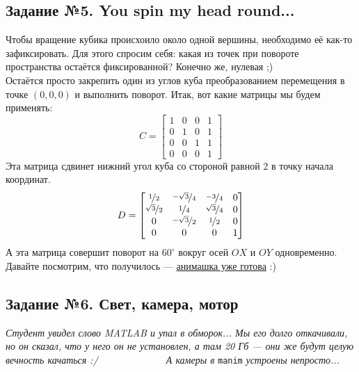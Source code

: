 \documentclass[a3paper,14pt]{extarticle}
\begin{document}
\subsection*{\centering Задание №5. You spin my head round...}
Чтобы вращение кубика происхоило около одной вершины, необходимо её как-то зафиксировать. Для этого спросим себя: какая из точек при повороте пространства остаётся фиксированной? Конечно же, нулевая ;)\\[0.5em]
Остаётся просто закрепить один из углов куба преобразованием перемещения в точке $(0, 0, 0)$ и выполнить поворот. Итак, вот какие матрицы мы будем применять:
$$C = \begin{bmatrix}
    1 & 0 & 0 & 1 \\ 0 & 1 & 0 & 1 \\ 0 & 0 & 1 & 1 \\ 0 & 0 & 0 & 1
\end{bmatrix}$$
Эта матрица сдвинет нижний угол куба со стороной равной 2 в точку начала координат.
$$D = \begin{bmatrix}
    \nicefrac{1}{2} & \nicefrac{-\sqrt{3}}{4} & \nicefrac{-3}{4} & 0 \\
    \nicefrac{\sqrt{3}}{2} & \nicefrac{1}{4} & \nicefrac{\sqrt{3}}{4} & 0 \\
    0 & \nicefrac{-\sqrt{3}}{2} & \nicefrac{1}{2} & 0 \\ 0 & 0 & 0 & 1
\end{bmatrix}$$
А эта матрица совершит поворот на $60^\circ$ вокруг осей $OX$ и $OY$ одновременно. Давайте посмотрим, что получилось --- \href{https://disk.yandex.ru/i/i6hjPyfOMITk6A}{анимашка уже готова} :)

\subsection*{\centering Задание №6. Свет, камера, мотор}
\textit{Студент увидел слово MATLAB и упал в обморок... Мы его долго откачивали, но он сказал, что у него он не установлен, а там 20 Гб --- они же будут целую вечность качаться :/$\qquad\qquad\qquad\quad$А камеры в }\verb|manim|\textit{ устроены непросто...}
\end{document}
